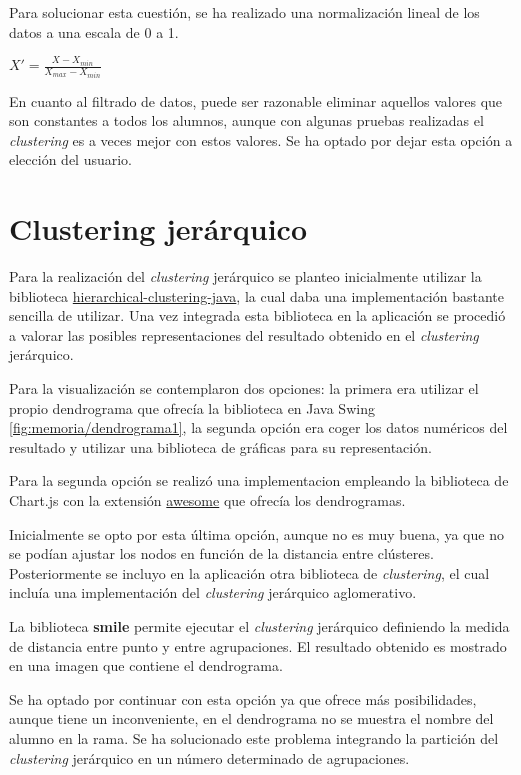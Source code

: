 Para solucionar esta cuestión, se ha realizado una normalización lineal de los datos a una escala de 0 a 1.

$X' = \frac{X - X_{min}}{X_{max} - X_{min}}$

En cuanto al filtrado de datos, puede ser razonable eliminar aquellos valores que son constantes a todos los alumnos, aunque con algunas pruebas realizadas el \emph{clustering} es a veces mejor con estos valores. Se ha optado por dejar esta opción a elección del usuario.

\section{Clustering jerárquico}
Para la realización del \emph{clustering} jerárquico se planteo inicialmente utilizar la biblioteca \href{https://github.com/lbehnke/hierarchical-clustering-java}{hierarchical-clustering-java}, la cual daba una implementación bastante sencilla de utilizar. Una vez integrada esta biblioteca en la aplicación se procedió a valorar las posibles representaciones del resultado obtenido en el \emph{clustering} jerárquico.

Para la visualización se contemplaron dos opciones: la primera era utilizar el propio dendrograma que ofrecía la biblioteca en Java Swing \ref{fig:memoria/dendrograma1}, la segunda opción era coger los datos numéricos del resultado y utilizar una biblioteca de gráficas para su representación.

Para la segunda opción se realizó una implementacion empleando la biblioteca de Chart.js con la extensión \href{https://github.com/chartjs/awesome}{awesome} que ofrecía los dendrogramas.

Inicialmente se opto por esta última opción, aunque no es muy buena, ya que no se podían ajustar los nodos en función de la distancia entre clústeres. Posteriormente se incluyo en la aplicación otra biblioteca de \emph{clustering}, el cual incluía una implementación del \emph{clustering} jerárquico aglomerativo.

La biblioteca \textbf{smile} permite ejecutar el \emph{clustering} jerárquico definiendo la medida de distancia entre punto y entre agrupaciones. El resultado obtenido es mostrado en una imagen que contiene el dendrograma.

Se ha optado por continuar con esta opción ya que ofrece más posibilidades, aunque tiene un inconveniente, en el dendrograma no se muestra el nombre del alumno en la rama. Se ha solucionado este problema integrando la partición del \emph{clustering} jerárquico en un número determinado de agrupaciones.


